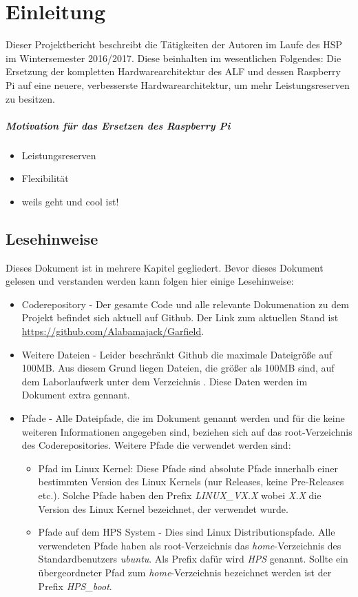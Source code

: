 \chapter{Einleitung}
Dieser Projektbericht beschreibt die Tätigkeiten der Autoren im Laufe des 
\ac{HSP} im Wintersemester 2016/2017. Diese beinhalten im wesentlichen 
Folgendes:
Die Ersetzung der kompletten Hardwarearchitektur des ALF und dessen Raspberry Pi 
auf eine neuere, verbesserste Hardwarearchitektur, um mehr Leistungsreserven zu 
besitzen.

\paragraph{Motivation für das Ersetzen des Raspberry Pi} 
\begin{itemize}
 \item Leistungsreserven
 \item Flexibilität
 \item weils geht und cool ist! 
\end{itemize}

\section{Lesehinweise}
Dieses Dokument ist in mehrere Kapitel gegliedert. Bevor dieses Dokument gelesen und verstanden werden kann folgen hier einige Lesehinweise:
\begin{itemize}
	\item Coderepository - Der gesamte Code und alle relevante Dokumenation zu dem Projekt befindet sich aktuell auf Github. Der Link zum aktuellen Stand ist \href{https://github.com/Alabamajack/Garfield}{https://github.com/Alabamajack/Garfield}. 
	\item Weitere Dateien - Leider beschränkt Github die maximale Dateigröße auf 100MB. Aus diesem Grund liegen Dateien, die größer als 100MB sind, auf dem Laborlaufwerk unter dem Verzeichnis . Diese Daten werden im Dokument extra gennant.
	\item Pfade - Alle Dateipfade, die im Dokument genannt werden und für die keine weiteren Informationen angegeben sind, beziehen sich auf das root-Verzeichnis des Coderepositories. Weitere Pfade die verwendet werden sind:
	\begin{itemize}
		\item Pfad im Linux Kernel: Diese Pfade sind absolute Pfade innerhalb einer bestimmten Version des Linux Kernels (nur Releases, keine Pre-Releases etc.). Solche Pfade haben den Prefix \textit{LINUX\_VX.X} wobei \textit{X.X} die Version des Linux Kernel bezeichnet, der verwendet wurde.
		\item Pfade auf dem \ac{HPS} System - Dies sind Linux Distributionspfade. Alle verwendeten Pfade haben als root-Verzeichnis das \textit{home}-Verzeichnis des Standardbenutzers \textit{ubuntu}. Als Prefix dafür wird \textit{HPS} genannt. Sollte ein übergeordneter Pfad zum \textit{home}-Verzeichnis bezeichnet werden ist der Prefix \textit{HPS\_boot}.
	\end{itemize}
\end{itemize}